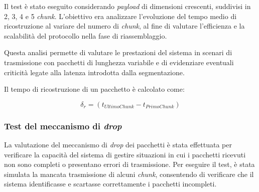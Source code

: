 \documentclass[12pt,a4paper,twoside]{book}
\begin{document}
Il test è stato eseguito considerando \emph{payload} di dimensioni crescenti, suddivisi in 2, 3, 4 e 5
\emph{chunk}.
L’obiettivo era analizzare l’evoluzione del tempo medio di ricostruzione al variare del numero di
\emph{chunk}, al fine di valutare l’efficienza e la scalabilità del protocollo nella fase di riassemblaggio.

Questa analisi permette di valutare le prestazioni del sistema in scenari di trasmissione con pacchetti
di lunghezza variabile e di evidenziare eventuali criticità legate alla latenza introdotta dalla segmentazione.

Il tempo di ricostruzione di un pacchetto è calcolato come:

\begin{equation}
    \delta_{r} = (t_{UltimoChunk} - t_{PrimoChunk})
    \label{formula:reconstruction-time}
\end{equation}

\subsubsection{Test del meccanismo di \emph{drop}}
\begin{table}[H]
    \centering
    \caption{Condizioni del test del meccanismo di \emph{drop}.}
    \label{tab:T3-conditions}
\end{table}
La valutazione del meccanismo di \emph{drop} dei pacchetti è stata effettuata
per verificare la capacità del sistema di gestire situazioni in cui i pacchetti
ricevuti non sono completi o presentano errori di trasmissione.
Per eseguire il test, è stata simulata la mancata trasmissione di alcuni \emph{chunk}, consentendo di
verificare che il sistema identificasse e scartasse correttamente i pacchetti incompleti.
\end{document}
